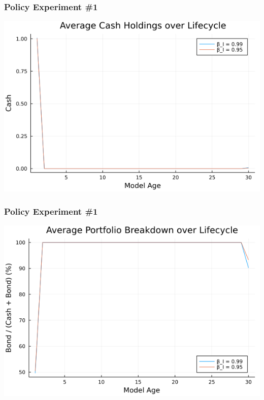 \documentclass[handout]{beamer}
\begin{document}
\begin{frame}
\frametitle{Policy Experiment \#1}

\begin{center}
\includegraphics[scale = 0.5]{cash}
\end{center}

\end{frame}


\begin{frame}
\frametitle{Policy Experiment \#1}

\begin{center}
\includegraphics[scale = 0.5]{portfolio}
\end{center}

\end{frame}
\end{document}

